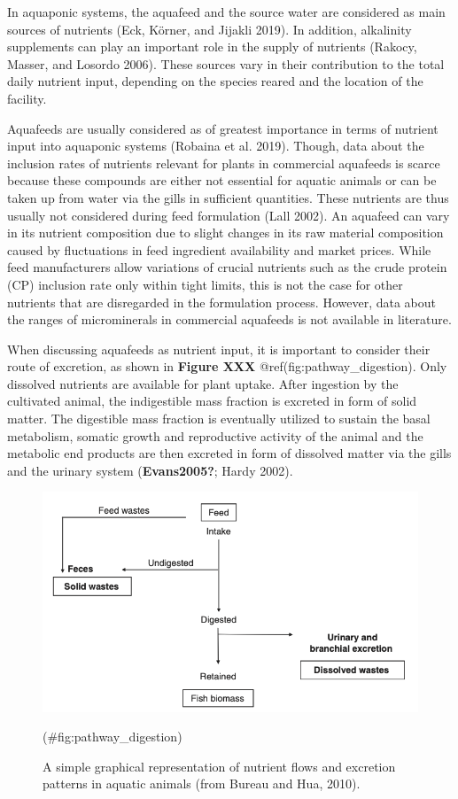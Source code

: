 \documentclass[
]{article}
\begin{document}
In aquaponic systems, the aquafeed and the source water are considered as main sources of nutrients (Eck, Körner, and Jijakli 2019). In addition, alkalinity supplements can play an important role in the supply of nutrients (Rakocy, Masser, and Losordo 2006). These sources vary in their contribution to the total daily nutrient input, depending on the species reared and the location of the facility.

Aquafeeds are usually considered as of greatest importance in terms of nutrient input into aquaponic systems (Robaina et al. 2019). Though, data about the inclusion rates of nutrients relevant for plants in commercial aquafeeds is scarce because these compounds are either not essential for aquatic animals or can be taken up from water via the gills in sufficient quantities. These nutrients are thus usually not considered during feed formulation (Lall 2002).
An aquafeed can vary in its nutrient composition due to slight changes in its raw material composition caused by fluctuations in feed ingredient availability and market prices. While feed manufacturers allow variations of crucial nutrients such as the crude protein (CP) inclusion rate only within tight limits, this is not the case for other nutrients that are disregarded in the formulation process. However, data about the ranges of microminerals in commercial aquafeeds is not available in literature.

When discussing aquafeeds as nutrient input, it is important to consider their route of excretion, as shown in \textbf{Figure XXX} @ref(fig:pathway\_digestion). Only dissolved nutrients are available for plant uptake. After ingestion by the cultivated animal, the indigestible mass fraction is excreted in form of solid matter. The digestible mass fraction is eventually utilized to sustain the basal metabolism, somatic growth and reproductive activity of the animal and the metabolic end products are then excreted in form of dissolved matter via the gills and the urinary system (\textbf{Evans2005?}; Hardy 2002).

\begin{figure}
\includegraphics[width=9.78in]{images/2010_Bureau} \caption{A simple graphical representation of nutrient flows and excretion patterns in aquatic animals (from Bureau and Hua, 2010).}(\#fig:pathway_digestion)
\end{figure}
\end{document}
